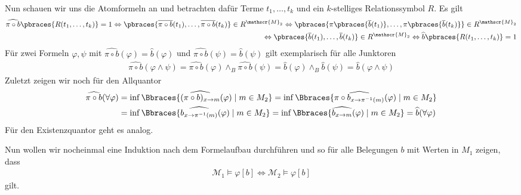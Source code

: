 \begin{solution}
	Nun schauen wir uns die Atomformeln an und betrachten dafür Terme $t_1, \dots, t_k$ und ein $k$-stelliges Relationssymbol $R$. Es gilt 
	\begin{align*}
	\widehat{\pi \circ b}\pbraces{R(t_1, \dots, t_k)} = 1 \Leftrightarrow \pbraces{\overline{\pi \circ b}(t_1), \dots, \overline{\pi \circ b}(t_k)} \in R^{\mathscr{M}_2} \Leftrightarrow \pbraces{\pi\pbraces{\overline{b}(t_1)}, \dots, \pi \pbraces{\overline{b}(t_k)}} \in R^{\mathscr{M}_2} \\
	\Leftrightarrow \pbraces{\overline{b}(t_1), \dots, \overline{b}(t_k)} \in R^{\mathscr{M}_2} \Leftrightarrow \widehat{b}\pbraces{R(t_1, \dots, t_k)} = 1
	\end{align*}
	Für zwei Formeln $\varphi, \psi$ mit $\widehat{\pi \circ b}(\varphi) = \widehat{b}(\varphi)$ und $\widehat{\pi \circ b}(\psi) = \widehat{b}(\psi)$ gilt exemplarisch für alle Junktoren
	\begin{align*}
	\widehat{\pi \circ b}(\varphi \land \psi) = \widehat{\pi \circ b}(\varphi) \land_B \widehat{\pi \circ b}(\psi) = \widehat{b}(\varphi) \land_B \widehat{b}(\psi) = \widehat{b}(\varphi \land \psi)
	\end{align*}
	Zuletzt zeigen wir noch für den Allquantor
	\begin{align*}
	\widehat{\pi \circ b}(\forall \varphi) &= \inf\Bbraces{\widehat{(\pi \circ b)_{x \to m}}(\varphi) \mid m \in M_2} = \inf\Bbraces{\widehat{\pi \circ b_{x \to \pi^{-1}(m)}}(\varphi) \mid m \in M_2} \\
	&= \inf\Bbraces{\widehat{b_{x \to \pi^{-1}(m)}}(\varphi) \mid m \in M_2} = \inf\Bbraces{\widehat{b_{x \to m}}(\varphi) \mid m \in M_2} = \widehat{b}(\forall \varphi)
	\end{align*}
	Für den Existenzquantor geht es analog. 
	
	Nun wollen wir nocheinmal eine Induktion nach dem Formelaufbau durchführen und so für alle Belegungen $b$ mit Werten in $M_1$ zeigen, dass 
	\begin{align*}
	\mathscr{M}_1 \vDash \varphi[b] \iff \mathscr{M}_2 \vDash \varphi[b]
	\end{align*}
	gilt.
	

\end{solution}
